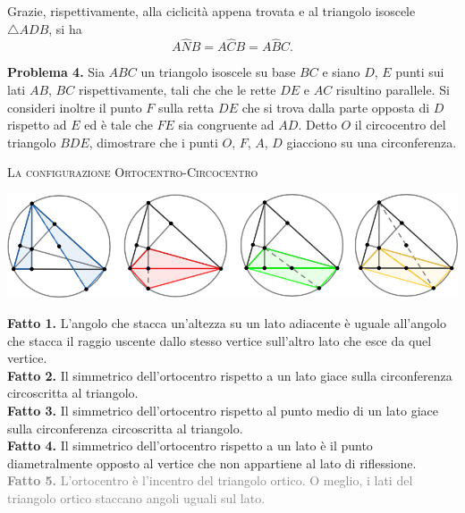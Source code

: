 \documentclass[a4paper]{article}
\theoremstyle{remark}
\theoremstyle{definition}
\begin{document}
\begin{multicols}{2}
Grazie, rispettivamente, alla ciclicità appena trovata e al triangolo isoscele $ \bigtriangleup ADB $, si ha
\[ A\hat{N}B = A\hat{C}B = A\hat{B}C.  \]

\textbf{Problema 4.} Sia $ ABC $ un triangolo isoscele su base $ BC $ e siano $ D $, $ E $ punti sui lati $ AB $, $ BC $ rispettivamente,
tali che che le rette $ DE $ e $ AC $ risultino parallele. Si consideri inoltre il punto $ F $ sulla retta $ DE $
che si trova dalla parte opposta di $ D $ rispetto ad $ E $ ed \`e tale che $ F E $ sia congruente ad $ AD $.
Detto $ O $ il circocentro del triangolo $ BDE $, dimostrare che i punti $ O $, $ F $, $ A $, $ D $ giacciono su una
circonferenza.

\columnbreak
\begin{center}
	\textsc{La configurazione Ortocentro-Circocentro}
\end{center}

\begin{center}
	\includegraphics[scale=0.25]{ehiu}
\end{center}

\textbf{Fatto 1.} L'angolo che stacca un'altezza su un lato adiacente è uguale all'angolo che stacca il raggio uscente dallo stesso vertice sull'altro lato che esce da quel vertice. \\

\textbf{Fatto 2.} Il simmetrico dell'ortocentro rispetto a un lato giace sulla circonferenza circoscritta al triangolo. \\

\textbf{Fatto 3.} Il simmetrico dell'ortocentro rispetto al punto medio di un lato giace sulla circonferenza circoscritta al triangolo. \\

\textbf{Fatto 4.} Il simmetrico dell'ortocentro rispetto a un lato è il punto diametralmente opposto al vertice che non appartiene al lato di riflessione. \\

\textcolor{gray}{\textbf{Fatto 5.} L'ortocentro è l'incentro del triangolo ortico. O meglio, i lati del triangolo ortico staccano angoli uguali sul lato.} \\


\end{multicols}
\end{document}
